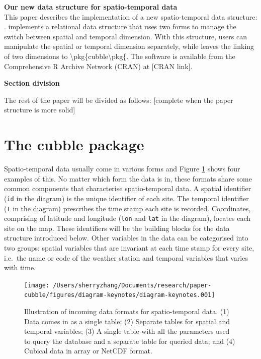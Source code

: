 \documentclass[
]{jss}
\begin{document}
\textbf{Our new data structure for spatio-temporal data}\\
This paper describes the implementation of a new spatio-temporal data
structure: .  implements a relational data
structure that uses two forms to manage the switch between spatial and
temporal dimension. With this structure, users can manipulate the
spatial or temporal dimension separately, while leaves the linking of
two dimensions to \textbackslash pkg\{cubble\textbackslash pkg\{. The
software is available from the Comprehensive R Archive Network (CRAN) at
{[}CRAN link{]}. \newline

\textbf{Section division}

The rest of the paper will be divided as follows: {[}complete when the
paper structure is more solid{]}

\newpage

\hypertarget{the-cubble-package}{%
\section{The cubble package}\label{the-cubble-package}}

Spatio-temporal data usually come in various forms and Figure
\ref{fig:cubble-diagram} shows four examples of this. No matter which
form the data is in, these formats share some common components that
characterise spatio-temporal data. A spatial identifier (\texttt{id} in
the diagram) is the unique identifier of each site. The temporal
identifier (\texttt{t} in the diagram) prescribes the time stamp each
site is recorded. Coordinates, comprising of latitude and longitude
(\texttt{lon} and \texttt{lat} in the diagram), locates each site on the
map. These identifiers will be the building blocks for the data
structure introduced below. Other variables in the data can be
categorised into two groups: spatial variables that are invariant at
each time stamp for every site, i.e.~the name or code of the weather
station and temporal variables that varies with time.

\begin{CodeChunk}
\begin{figure}

{\centering \texttt{[image: /Users/sherryzhang/Documents/research/paper-cubble/figures/diagram-keynotes/diagram-keynotes.001]} 

}

\caption[Illustration of incoming data formats for spatio-temporal data]{Illustration of incoming data formats for spatio-temporal data. (1) Data comes in as a single table; (2) Separate tables for spatial and temporal variables; (3) A single table with all the parameters used to query the database and a separate table for queried data; and (4) Cubical data in array or NetCDF format.}\label{fig:cubble-diagram}
\end{figure}
\end{CodeChunk}
\end{document}
